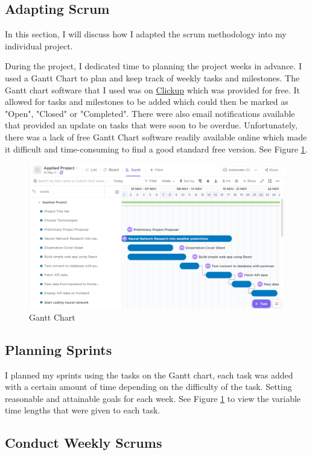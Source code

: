 \subsection{Adapting Scrum}
In this section, I will discuss how I adapted the scrum methodology into my individual project. 

During the project, I dedicated time to planning the project weeks in advance. I used a Gantt Chart to plan and keep track of weekly tasks and milestones. The Gantt chart software that I used was on \href{https://app.clickup.com}{Clickup} which was provided for free. It allowed for tasks and milestones to be added which could then be marked as "Open", "Closed" or "Completed". There were also email notifications available that provided an update on tasks that were soon to be overdue. Unfortunately, there was a lack of free Gantt Chart software readily available online which made it difficult and time-consuming to find a good standard free version. See Figure \ref{Gantt}.

\begin{figure}[h]
\centering
\includegraphics[scale=0.4]{img/GanttChart.PNG}
\caption{Gantt Chart}
\label{Gantt}
\end{figure}

\subsection{Planning Sprints}

I planned my sprints using the tasks on the Gantt chart, each task was added with a certain amount of time depending on the difficulty of the task. Setting reasonable and attainable goals for each week. See Figure \ref{Gantt} to view the variable time lengths that were given to each task.

\subsection{Conduct Weekly Scrums}

